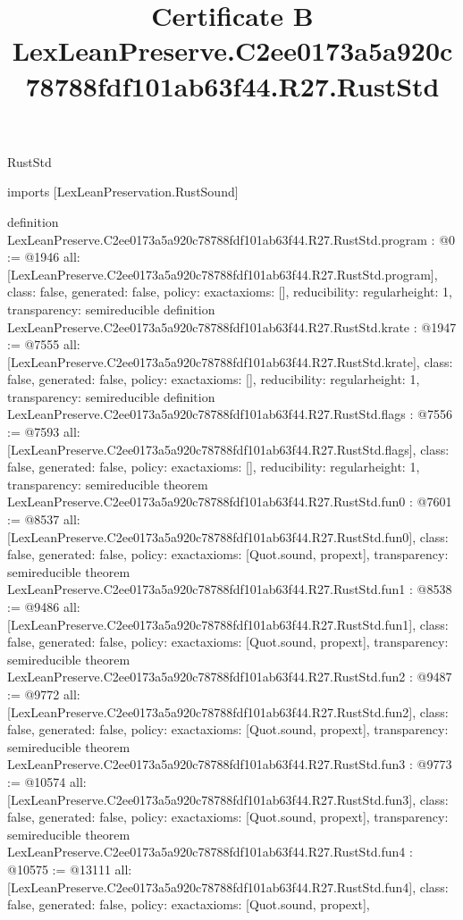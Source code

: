 \begin{lexlean}{RustStd}
\title{Certificate B LexLeanPreserve.C2ee0173a5a920c78788fdf101ab63f44.R27.RustStd}
\begin{coremodule}
imports [LexLeanPreservation.RustSound]

definition LexLeanPreserve.C2ee0173a5a920c78788fdf101ab63f44.R27.RustStd.program : @0 := @1946 {
  all: [LexLeanPreserve.C2ee0173a5a920c78788fdf101ab63f44.R27.RustStd.program],
  class: false,
  generated: false,
  policy: exact{axioms: []},
  reducibility: regular{height: 1},
  transparency: semireducible
}
definition LexLeanPreserve.C2ee0173a5a920c78788fdf101ab63f44.R27.RustStd.krate : @1947 := @7555 {
  all: [LexLeanPreserve.C2ee0173a5a920c78788fdf101ab63f44.R27.RustStd.krate],
  class: false,
  generated: false,
  policy: exact{axioms: []},
  reducibility: regular{height: 1},
  transparency: semireducible
}
definition LexLeanPreserve.C2ee0173a5a920c78788fdf101ab63f44.R27.RustStd.flags : @7556 := @7593 {
  all: [LexLeanPreserve.C2ee0173a5a920c78788fdf101ab63f44.R27.RustStd.flags],
  class: false,
  generated: false,
  policy: exact{axioms: []},
  reducibility: regular{height: 1},
  transparency: semireducible
}
theorem LexLeanPreserve.C2ee0173a5a920c78788fdf101ab63f44.R27.RustStd.fun0 : @7601 := @8537 {
  all: [LexLeanPreserve.C2ee0173a5a920c78788fdf101ab63f44.R27.RustStd.fun0],
  class: false,
  generated: false,
  policy: exact{axioms: [Quot.sound, propext]},
  transparency: semireducible
}
theorem LexLeanPreserve.C2ee0173a5a920c78788fdf101ab63f44.R27.RustStd.fun1 : @8538 := @9486 {
  all: [LexLeanPreserve.C2ee0173a5a920c78788fdf101ab63f44.R27.RustStd.fun1],
  class: false,
  generated: false,
  policy: exact{axioms: [Quot.sound, propext]},
  transparency: semireducible
}
theorem LexLeanPreserve.C2ee0173a5a920c78788fdf101ab63f44.R27.RustStd.fun2 : @9487 := @9772 {
  all: [LexLeanPreserve.C2ee0173a5a920c78788fdf101ab63f44.R27.RustStd.fun2],
  class: false,
  generated: false,
  policy: exact{axioms: [Quot.sound, propext]},
  transparency: semireducible
}
theorem LexLeanPreserve.C2ee0173a5a920c78788fdf101ab63f44.R27.RustStd.fun3 : @9773 := @10574 {
  all: [LexLeanPreserve.C2ee0173a5a920c78788fdf101ab63f44.R27.RustStd.fun3],
  class: false,
  generated: false,
  policy: exact{axioms: [Quot.sound, propext]},
  transparency: semireducible
}
theorem LexLeanPreserve.C2ee0173a5a920c78788fdf101ab63f44.R27.RustStd.fun4 : @10575 := @13111 {
  all: [LexLeanPreserve.C2ee0173a5a920c78788fdf101ab63f44.R27.RustStd.fun4],
  class: false,
  generated: false,
  policy: exact{axioms: [Quot.sound, propext]},
}
\end{coremodule}
\end{lexlean}
